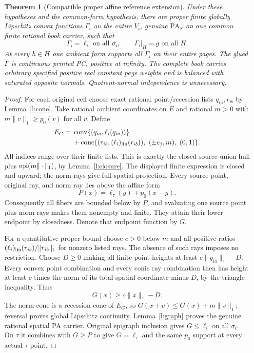 \documentclass[11pt]{article}
\newtheorem{theorem}{Theorem}[section]
\theoremstyle{definition}\newtheorem{definition}[theorem]{Definition}
\theoremstyle{remark}\newtheorem{remark}[theorem]{Remark}
\newcommand{\R}{\mathbb R}\newcommand{\Q}{\mathbb Q}
\newcommand{\conv}{\operatorname{conv}}\newcommand{\cone}{\operatorname{cone}}
\newcommand{\PA}{\mathrm{PA}}\newcommand{\dist}{\operatorname{dist}}
\begin{document}
\begin{theorem}[Compatible proper affine reference extension]\label{t:reference}
Under these hypotheses and the common-form hypothesis, there are proper finite globally Lipschitz convex functions $\Gamma_i$ on the entire $V_i$, genuine $\PA_\R$ on one common finite rational book carrier, such that
\[
 \Gamma_i=\ell_i\text{ on all }\sigma_i,\qquad
 \Gamma_i|_H=g\text{ on all }H.
\]
At every $h\in H$ one ambient form supports all $\Gamma_i$ on their entire pages. The glued $\Gamma$ is continuous printed PC, positive at infinity. The complete book carries arbitrary specified positive real constant page weights and is balanced with saturated opposite normals. Quotient-normal independence is unnecessary.
\end{theorem}
\begin{proof}
For each original cell choose exact rational point/recession lists $q_{ia},r_{ib}$ by Lemma~\ref{l:cone}. Take rational ambient coordinates on $E$ and rational $m>0$ with $m\|v\|_1\geq p_0(v)$ for all $v$. Define
\begin{align*}
 E_G={}&\conv\{(q_{ia},\ell_i(q_{ia}))\}\\
 &+\cone\{(r_{ib},(\ell_i)_{\rm lin}(r_{ib})),\ (\pm e_j,m),\ (0,1)\}.
\end{align*}
All indices range over their finite lists. This is exactly the closed source-union hull plus $\operatorname{epi}(m\|\cdot\|_1)$, by Lemma~\ref{l:closure}. The displayed finite expression is closed and upward; the norm rays give full spatial projection. Every source point, original ray, and norm ray lies above the affine form
\[
 P(x)=\ell_\tau(y)+p_0(x-y).
\]
Consequently all fibers are bounded below by $P$, and evaluating one source point plus norm rays makes them nonempty and finite. They attain their lower endpoint by closedness. Denote that endpoint function by $G$.

For a quantitative proper bound choose $c>0$ below $m$ and all positive ratios $(\ell_i)_{\rm lin}(r_{ib})/\|r_{ib}\|_1$ for nonzero listed rays. The absence of such rays imposes no restriction. Choose $D\geq0$ making all finite point heights at least $c\|q_{ia}\|_1-D$. Every convex point combination and every conic ray combination then has height at least $c$ times the norm of its total spatial coordinate minus $D$, by the triangle inequality. Thus
\[
 G(x)\geq c\|x\|_1-D.
\]
The norm cone is a recession cone of $E_G$, so $G(x+v)\leq G(x)+m\|v\|_1$; reversal proves global Lipschitz continuity. Lemma~\ref{l:graph} proves the genuine rational spatial PA carrier. Original epigraph inclusion gives $G\leq\ell_i$ on all $\sigma_i$. On $\tau$ it combines with $G\geq P$ to give $G=\ell_\tau$ and the same $p_0$ support at every actual $\tau$ point.


\end{proof}
\end{document}
